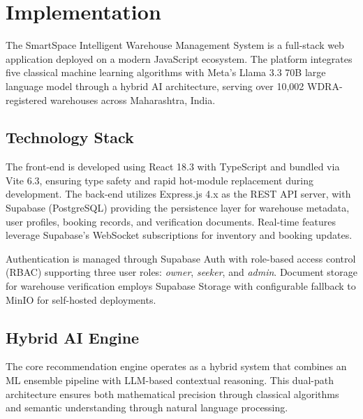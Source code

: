 
\section{Implementation}

The SmartSpace Intelligent Warehouse Management System is a full-stack web application deployed on a modern JavaScript ecosystem. The platform integrates five classical machine learning algorithms with Meta's Llama 3.3 70B large language model through a hybrid AI architecture, serving over 10,002 WDRA-registered warehouses across Maharashtra, India.

\subsection{Technology Stack}

The front-end is developed using React 18.3 with TypeScript and bundled via Vite 6.3, ensuring type safety and rapid hot-module replacement during development. The back-end utilizes Express.js 4.x as the REST API server, with Supabase (PostgreSQL) providing the persistence layer for warehouse metadata, user profiles, booking records, and verification documents. Real-time features leverage Supabase's WebSocket subscriptions for inventory and booking updates.

Authentication is managed through Supabase Auth with role-based access control (RBAC) supporting three user roles: \textit{owner}, \textit{seeker}, and \textit{admin}. Document storage for warehouse verification employs Supabase Storage with configurable fallback to MinIO for self-hosted deployments.

\subsection{Hybrid AI Engine}

The core recommendation engine operates as a hybrid system that combines an ML ensemble pipeline with LLM-based contextual reasoning. This dual-path architecture ensures both mathematical precision through classical algorithms and semantic understanding through natural language processing.

